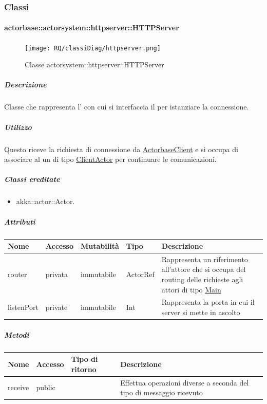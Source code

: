 \documentclass{scalatekids-article}
\begin{document}
\subsubsection{Classi}

\paragraph{actorbase::actorsystem::httpserver::HTTPServer}
\label{sec:actorbase::actorsystem::httpserver::HTTPServer}

\begin{figure}[H]
   \begin{center}
     \texttt{[image: RQ/classiDiag/httpserver.png]}
     \caption{Classe actorsystem::httpserver::HTTPServer}
   \end{center}
 \end{figure}

\subparagraph{Descrizione}
Classe che rappresenta l' con cui si interfaccia il  per
istanziare la connessione.

\subparagraph{Utilizzo}

Questo  riceve la richiesta di connessione da
\hyperref[sec:actorbase::driver::client::ActorbaseClient]{ActorbaseClient}
e si occupa di associare al  un  di tipo
\hyperref[sec:actorbase::actorsystem::clientactor::ClientActor]{ClientActor}
per continuare le comunicazioni.

\subparagraph{Classi ereditate}
\begin{itemize}
\item akka::actor::Actor.
\end{itemize}

\subparagraph{Attributi}
\begin{tabular}{| p{3cm} | p{1.5cm} | p{2cm} | p{2cm} | p{8.5cm} |}
  \hline
  Nome & Accesso & Mutabilità & Tipo & Descrizione\\
  \hline
  router & privata & immutabile & ActorRef & Rappresenta un riferimento all'attore che si occupa del routing delle richieste agli attori di tipo \hyperref[sec:actorbase::actorsystem::main::Main]{Main} \\
  \hline
  listenPort & private & immutabile & Int & Rappresenta la porta in cui il server si mette in ascolto \\
  \hline
\end{tabular}

\subparagraph{Metodi}

\begin{tabular}{| l | l | l | l |}
  \hline
  Nome & Accesso & Tipo di ritorno & Descrizione\\
  \hline
  receive & public &  & Effettua operazioni diverse a seconda del tipo di messaggio ricevuto\\
  \hline
\end{tabular}
\end{document}
